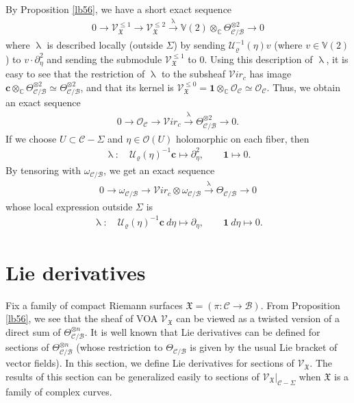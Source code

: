 \documentclass[12pt,b5paper,notitlepage]{report}
\theoremstyle{definition}
\theoremstyle{plain}
\newcommand{\fk}{\mathfrak}
\newcommand{\mc}{\mathcal}
\newcommand{\id}{\mathbf{1}}
\newcommand{\scr}{\mathscr}
\newcommand{\Vbb}{\mathbb V}
\newcommand{\Cbb}{\mathbb C}
\newcommand{\cbf}{\mathbf c}
\newcommand{\svir}{\mathcal V\!\mathit{ir}}
\numberwithin{equation}{section}
\begin{document}
By Proposition \ref{lb56}, we have a short exact sequence
\begin{align*}
0\rightarrow\scr V_{\fk X}^{\leq 1} \rightarrow\scr V_{\fk X}^{\leq 2}\xrightarrow{\uplambda}\Vbb(2)\otimes_\Cbb\Theta_{\mc C/\mc B}^{\otimes 2}\rightarrow 0
\end{align*}
where $\uplambda$ is described locally (outside $\Sigma$)  by sending  $\mc U_\varrho^{-1}(\eta)v$ (where $v\in\Vbb(2)$) to  $v\cdot \partial_\eta^2$ and sending the submodule $\scr V_{\fk X}^{\leq 1}$ to $0$. Using this description of $\uplambda$, it is easy to see that the restriction of $\uplambda$ to the subsheaf $\svir_c$ has image $\cbf\otimes_\Cbb \Theta_{\mc C/\mc B}^{\otimes 2}\simeq \Theta_{\mc C/\mc B}^{\otimes 2}$, and that its kernel is $\scr V_{\fk X}^{\leq 0}=\id\otimes_\Cbb\scr O_{\mc C}\simeq\scr O_{\mc C}$. Thus, we obtain an exact sequence
\begin{align}
0\rightarrow\scr O_{\mc C} \rightarrow\svir_c\xrightarrow{\uplambda}\Theta_{\mc C/\mc B}^{\otimes 2}\rightarrow 0.\label{eq168}
\end{align}
If we choose $U\subset\mc C-\Sigma$ and $\eta\in\scr O(U)$ holomorphic on each fiber,  then
\begin{gather*}
\uplambda:\quad \mc U_\varrho(\eta)^{-1}\cbf\mapsto \partial_\eta^2,\qquad \id\mapsto 0.
\end{gather*}
By tensoring with $\omega_{\mc C/\mc B}$, we get an exact sequence
\begin{gather}
0\rightarrow\omega_{\mc C/\mc B} \rightarrow\svir_c\otimes \omega_{\mc C/\mc B}\xrightarrow{\uplambda} \Theta_{\mc C/\mc B}\rightarrow 0\label{eq154}
\end{gather}
whose local expression outside $\Sigma$ is
\begin{gather}
\uplambda:\quad \mc U_\varrho(\eta)^{-1}\cbf ~d\eta\mapsto \partial_\eta,\qquad \id ~d\eta\mapsto 0.\label{eq155}
\end{gather}


 











\section{Lie derivatives}\label{lb50}



Fix a family of compact Riemann surfaces $\fk X=(\pi:\mc C\rightarrow\mc B)$. From Proposition \ref{lb56}, we see that the sheaf of VOA $\scr V_{\fk X}$ can be viewed as a twisted version of a direct sum of $\Theta_{\mc C/\mc B}^{\otimes n}$. It is well known that Lie derivatives can be defined for sections of $\Theta_{\mc C/\mc B}^{\otimes n}$ (whose restriction to $\Theta_{\mc C/\mc B}$ is given by the usual Lie bracket of vector fields). In this section, we define Lie derivatives for sections of $\scr V_{\fk X}$. The results of this section can be generalized easily to sections of $\scr V_{\fk X}|_{\mc C-\Sigma}$ when $\fk X$ is a family of complex curves.
\end{document}
